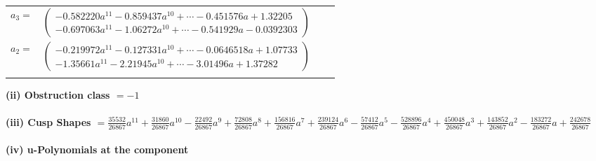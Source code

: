 \documentclass[1p]{elsarticle_modified}
\theoremstyle{definition}
\begin{document}
\begin{tabular}{m{7pt} m{180pt} m{7pt} m{180pt} }
\flushright $a_{3}=$&$\begin{pmatrix}-0.582220 a^{11}-0.859437 a^{10}+\cdots-0.451576 a+1.32205\\-0.697063 a^{11}-1.06272 a^{10}+\cdots-0.541929 a-0.0392303\end{pmatrix}$ \\
\flushright $a_{2}=$&$\begin{pmatrix}-0.219972 a^{11}-0.127331 a^{10}+\cdots-0.0646518 a+1.07733\\-1.35661 a^{11}-2.21945 a^{10}+\cdots-3.01496 a+1.37282\end{pmatrix}$\\&\end{tabular}
\flushleft \textbf{(ii) Obstruction class $= -1$}\\~\\
\flushleft \textbf{(iii) Cusp Shapes $= \frac{35532}{26867} a^{11}+\frac{31860}{26867} a^{10}-\frac{22492}{26867} a^9+\frac{72808}{26867} a^8+\frac{156816}{26867} a^7+\frac{239124}{26867} a^6-\frac{57412}{26867} a^5-\frac{528896}{26867} a^4+\frac{450048}{26867} a^3+\frac{143852}{26867} a^2-\frac{183272}{26867} a+\frac{242678}{26867}$}\\~\\
\newpage\renewcommand{\arraystretch}{1}
\flushleft \textbf{(iv) u-Polynomials at the component}\newline \\
\end{document}

